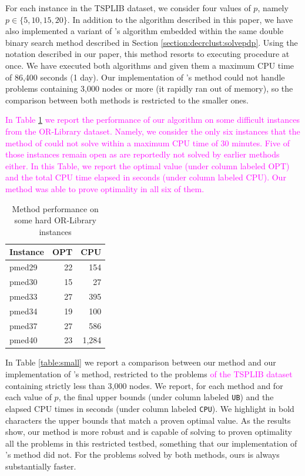 \documentclass[ijoo,nonblindrev]{informs-ijoo}
\begin{document}
For each instance in the TSPLIB dataset, we consider four values of $p$, namely $p\in\{5, 10, 15, 20\}$. In addition to the algorithm described in this paper, we have also implemented a variant of \citet{Sayah2017new}'s algorithm embedded within the same double binary search method described in Section \ref{section:decrclust:solvepdp}. Using the notation described in our paper, this method resorts to executing procedure  at once. We have executed both algorithms and given them a maximum CPU time of 86,400 seconds (1 day). Our implementation of \citeauthor{Sayah2017new}'s method could not handle problems containing 3,000 nodes or more (it rapidly ran out of memory), so the comparison between both methods is restricted to the smaller ones.

\textcolor{magenta}{In Table \ref{table:orlib} we report the performance of our algorithm on some difficult instances from the OR-Library dataset. Namely, we consider the only six instances that the method of \citet{Sayah2017new} could not solve within a maximum CPU time of 30 minutes. Five of those instances remain open as are reportedly not solved by earlier methods either. In this Table, we report the optimal value (under column labeled OPT) and the total CPU time elapsed in seconds (under column labeled CPU). Our method was able to prove optimality in all six of them.}

\begin{table}[!hbtp]
	\centering
	\begin{tabular}{|l|rr|}
		\hline
		Instance & OPT & CPU\\
		\hline
		pmed29	& 22	& 154\\
		pmed30	& 15	& 27\\
		pmed33	& 27	& 395\\
		pmed34	& 19	& 100\\
		pmed37	& 27	& 586\\
		pmed40	& 23	& 1,284\\
		\hline
	\end{tabular}
\caption{Method performance on some hard OR-Library instances\label{table:orlib}}
\end{table}

In Table \ref{table:small} we report a comparison between our method and our implementation of \citeauthor{Sayah2017new}'s method, restricted to the problems \textcolor{magenta}{of the TSPLIB dataset} containing strictly less than 3,000 nodes. We report, for each method and for each value of $p$, the final upper bounds (under column labeled \texttt{UB}) and the elapsed CPU times in seconds (under column labeled \texttt{CPU}). We highlight in bold characters the upper bounds that match a proven optimal value. As the results show, our method is more robust and is capable of solving to proven optimality all the problems in this restricted testbed, something that our implementation of \citeauthor{Sayah2017new}'s method did not. For the problems solved by both methods, ours is always substantially faster.
\end{document}
